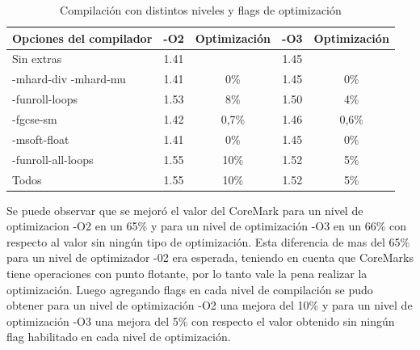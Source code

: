 \begin{table}[!h]
\begin{center}
\begin{tabular}{ |l |c |c |c |c|}
\hline
\rowcolor[gray]{0.8} Opciones del compilador&-O2& Optimización &-O3& Optimización \\
\hline
Sin extras 					& 1.41 	& 			& 1.45 &  \\
\hline
-mhard-div -mhard-mu 		& 1.41	& 0\%		& 1.45 & 0\% \\
\hline
-funroll-loops			 	& 1.53	& 8\%		& 1.50 & 4\%\\
\hline
-fgcse-sm					& 1.42	& 0,7\%		& 1.46 & 0,6\%\\
\hline
-msoft-float 				& 1.41	& 0\%		& 1.45 & 0\%\\
\hline
-funroll-all-loops	 		& 1.55	& 10\%		& 1.52 & 5\%\\
\hline
Todos	 					& 1.55	& 10\%		& 1.52 & 5\%\\
\hline
\end{tabular}
\end{center}
\caption{Compilación con distintos niveles y flags de optimización}
\label{tab:conbench2}
\end{table}

Se puede observar que se mejoró el valor del CoreMark para un nivel de optimizacion -O2 en un 65\% y para un nivel de optimización -O3 en un 66\% con respecto al valor sin ningún tipo de optimización. Esta diferencia de mas del 65\% para un nivel de optimizador -02 era esperada, teniendo en cuenta que CoreMarks tiene operaciones con punto flotante, por lo tanto vale la pena realizar la optimización. Luego agregando flags en cada nivel de compilación se pudo obtener para un nivel de optimización -O2 una mejora del 10\% y para un nivel de optimización -O3 una mejora del 5\%  con respecto el valor obtenido sin ningún flag habilitado en cada nivel de optimización. 


